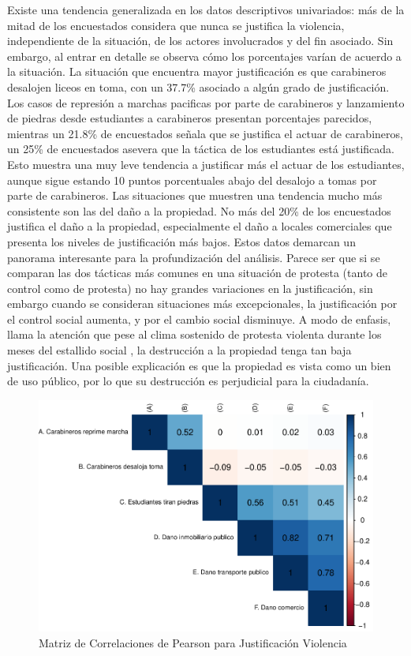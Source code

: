 \documentclass[12pt,twoside]{templates/facsothesis}
\begin{document}
Existe una tendencia generalizada en los datos descriptivos univariados: más de la mitad de los encuestados considera que nunca se justifica la violencia, independiente de la situación, de los actores involucrados y del fin asociado. Sin embargo, al entrar en detalle se observa cómo los porcentajes varían de acuerdo a la situación. La situación que encuentra mayor justificación es que carabineros desalojen liceos en toma, con un 37.7\% asociado a algún grado de justificación. Los casos de represión a marchas pacificas por parte de carabineros y lanzamiento de piedras desde estudiantes a carabineros presentan porcentajes parecidos, mientras un 21.8\% de encuestados señala que se justifica el actuar de carabineros, un 25\% de encuestados asevera que la táctica de los estudiantes está justificada. Esto muestra una muy leve tendencia a justificar más el actuar de los estudiantes, aunque sigue estando 10 puntos porcentuales abajo del desalojo a tomas por parte de carabineros. Las situaciones que muestren una tendencia mucho más consistente son las del daño a la propiedad. No más del 20\% de los encuestados justifica el daño a la propiedad, especialmente el daño a locales comerciales que presenta los niveles de justificación más bajos. Estos datos demarcan un panorama interesante para la profundización del análisis. Parece ser que si se comparan las dos tácticas más comunes en una situación de protesta (tanto de control como de protesta) no hay grandes variaciones en la justificación, sin embargo cuando se consideran situaciones más excepcionales, la justificación por el control social aumenta, y por el cambio social disminuye. A modo de enfasis, llama la atención que pese al clima sostenido de protesta violenta durante los meses del estallido social \citep{Joignant2020}, la destrucción a la propiedad tenga tan baja justificación. Una posible explicación es que la propiedad es vista como un bien de uso público, por lo que su destrucción es perjudicial para la ciudadanía.

\begin{figure}[!ht]

{\centering \includegraphics[width=1\linewidth,]{tesis_files/figure-latex/matpearson-1} 

}

\caption{Matriz de Correlaciones de Pearson  para Justificación Violencia}\label{fig:matpearson}
\end{figure}
\end{document}

